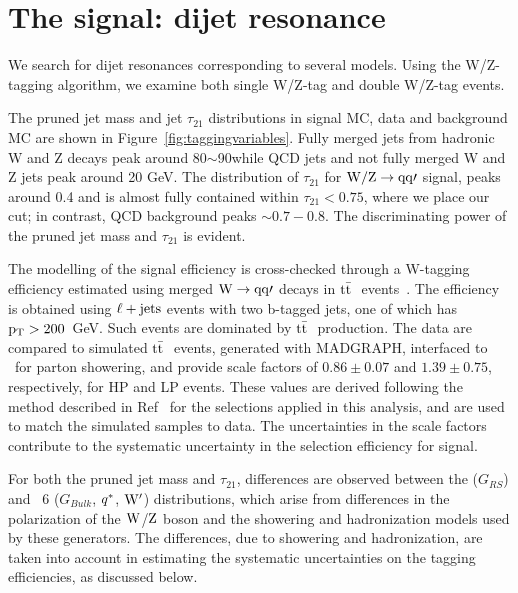 \section{The signal: dijet resonance}
\label{sec:signal}

We search for dijet resonances corresponding to several models.
Using the W/Z-tagging algorithm, we examine both single W/Z-tag and double W/Z-tag events.

The pruned jet mass and jet $\tau_{21}$ distributions in signal MC, data and background MC are shown in Figure~\ref{fig:taggingvariables}.
Fully merged jets from hadronic W and Z decays peak around 80$\sim$90\GeVcc while QCD jets and not fully merged W and Z jets peak around 20 GeV.
The distribution
of $\tau_{21}$ for ${\rm W/Z \to qq\prime}$ signal, peaks around 0.4 and is almost
fully contained within $\tau_{21} < 0.75$, where we place our cut; 
in contrast, QCD background peaks ${\sim}0.7-0.8$. 
The discriminating power of the pruned jet mass and $\tau_{21}$ is evident.


The modelling of the signal efficiency is cross-checked through a W-tagging efficiency 
estimated using merged ${\rm W \to qq\prime}$ decays in $\mathrm{t}\bar{\mathrm{t}}~$
events~\cite{JME-13-006}. The efficiency is obtained using ${\rm \ell + jets}$ events with two b-tagged jets, 
one of which has $\mathrm{p_{T}} > 200$~GeV. Such events are dominated by $\mathrm{t}\bar{\mathrm{t}}~$
production. The data are compared to simulated $\mathrm{t}\bar{\mathrm{t}}~$ events, 
generated with MADGRAPH, interfaced to 
\PYTHIA~for parton showering, and provide scale factors of 
$0.86 \pm 0.07$ and $1.39 \pm 0.75$,
respectively, for HP and LP events. 
These values are derived following the method described in Ref~\cite{JME-13-006}
 for the selections applied in this analysis, and are used to match the 
 simulated samples to data. 
 The uncertainties in the scale factors contribute to the systematic uncertainty in 
 the selection efficiency for signal.


For both the pruned jet mass and $\tau_{21}$, differences are observed
between the \HERWIG{++} ($G_{RS}$) and \PYTHIA~6
($G_{Bulk}$, $q^*$, $\mathrm{W}^{\prime}$) distributions, which arise from
differences in the polarization of the ${\rm W}$/${\rm Z}$ boson and the
showering and hadronization models used by these generators. 
The differences, due to showering and hadronization,
are taken into account in estimating the systematic uncertainties
on the tagging efficiencies, as discussed below.

